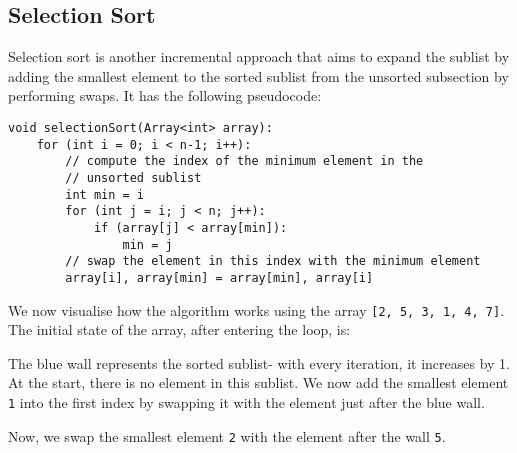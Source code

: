 \documentclass[a4paper, openany]{memoir}
\begin{document}
\subsection{Selection Sort}
Selection sort is another incremental approach that aims to expand the sublist by adding the smallest element to the sorted sublist from the unsorted subsection by performing swaps. It has the following pseudocode:
\begin{lstlisting}[language=pseudocode]
void selectionSort(Array<int> array):
    for (int i = 0; i < n-1; i++):
        // compute the index of the minimum element in the  
        // unsorted sublist
        int min = i
        for (int j = i; j < n; j++):
            if (array[j] < array[min]):
                min = j
        // swap the element in this index with the minimum element
        array[i], array[min] = array[min], array[i]
\end{lstlisting}
We now visualise how the algorithm works using the array \texttt{[2, 5, 3, 1, 4, 7]}. The initial state of the array, after entering the loop, is:
\begin{center}
\end{center}
The blue wall represents the sorted sublist- with every iteration, it increases by 1. At the start, there is no element in this sublist. We now add the smallest element \texttt{1} into the first index by swapping it with the element just after the blue wall.
\begin{center}
\end{center}
Now, we swap the smallest element \texttt{2} with the element after the wall \texttt{5}.
\begin{center}
\end{center}
\end{document}
